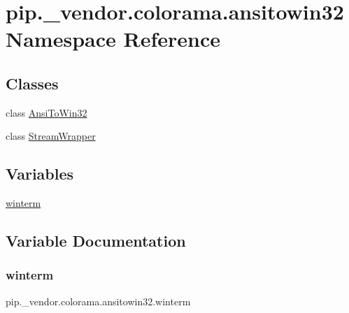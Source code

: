 \hypertarget{namespacepip_1_1__vendor_1_1colorama_1_1ansitowin32}{}\section{pip.\+\_\+vendor.\+colorama.\+ansitowin32 Namespace Reference}
\label{namespacepip_1_1__vendor_1_1colorama_1_1ansitowin32}
\subsection*{Classes}
\begin{DoxyCompactItemize}
\item 
class \hyperlink{classpip_1_1__vendor_1_1colorama_1_1ansitowin32_1_1AnsiToWin32}{Ansi\+To\+Win32}
\item 
class \hyperlink{classpip_1_1__vendor_1_1colorama_1_1ansitowin32_1_1StreamWrapper}{Stream\+Wrapper}
\end{DoxyCompactItemize}
\subsection*{Variables}
\begin{DoxyCompactItemize}
\item 
\hyperlink{namespacepip_1_1__vendor_1_1colorama_1_1ansitowin32_a0c0c1a6e40dcf4d21463064e0f7d4fea}{winterm}
\end{DoxyCompactItemize}


\subsection{Variable Documentation}
\mbox{\label{namespacepip_1_1__vendor_1_1colorama_1_1ansitowin32_a0c0c1a6e40dcf4d21463064e0f7d4fea}} 
\subsubsection{\texorpdfstring{winterm}{winterm}}
{\footnotesize\ttfamily pip.\+\_\+vendor.\+colorama.\+ansitowin32.\+winterm}

